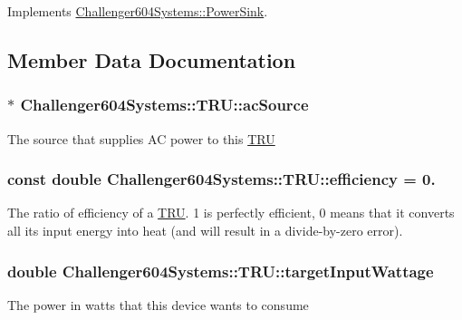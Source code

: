 Implements \hyperlink{class_challenger604_systems_1_1_power_sink_ade0817850ef945ba0751d757bceeee65}{Challenger604\-Systems\-::\-Power\-Sink}.



\subsection{Member Data Documentation}
\hypertarget{class_challenger604_systems_1_1_t_r_u_a501cfc80d8c3cecc892787eca2f0d221}{
\subsubsection[{ac\-Source}]{$\ast$ Challenger604\-Systems\-::\-T\-R\-U\-::ac\-Source\hspace{0.3cm}{\ttfamily [protected]}}}\label{class_challenger604_systems_1_1_t_r_u_a501cfc80d8c3cecc892787eca2f0d221}
The source that supplies A\-C power to this \hyperlink{class_challenger604_systems_1_1_t_r_u}{T\-R\-U} \hypertarget{class_challenger604_systems_1_1_t_r_u_a1fe9c57208efea35e91dce1cc2342375}{
\subsubsection[{efficiency}]{\setlength{\rightskip}{0pt plus 5cm}const double Challenger604\-Systems\-::\-T\-R\-U\-::efficiency = 0.\hspace{0.3cm}{\ttfamily [static]}}}\label{class_challenger604_systems_1_1_t_r_u_a1fe9c57208efea35e91dce1cc2342375}
The ratio of efficiency of a \hyperlink{class_challenger604_systems_1_1_t_r_u}{T\-R\-U}. 1 is perfectly efficient, 0 means that it converts all its input energy into heat (and will result in a divide-\/by-\/zero error). \hypertarget{class_challenger604_systems_1_1_t_r_u_a1a6fadddaee44ec1152fc1859c4b0af3}{
\subsubsection[{target\-Input\-Wattage}]{\setlength{\rightskip}{0pt plus 5cm}double Challenger604\-Systems\-::\-T\-R\-U\-::target\-Input\-Wattage\hspace{0.3cm}{\ttfamily [protected]}}}\label{class_challenger604_systems_1_1_t_r_u_a1a6fadddaee44ec1152fc1859c4b0af3}
The power in watts that this device wants to consume 

